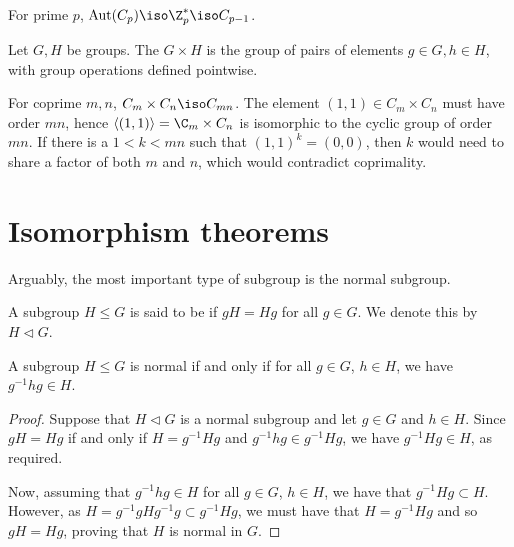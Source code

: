 \documentclass[12pt]{report}
\newcommand{\Aut}{\operatorname{Aut}}
\begin{document}
\begin{example}
  For prime \(p\), \(\Aut(C_{p}) \iso \Z^{*}_{p} \iso C_{p-1}\).
\end{example}

\begin{definition}
  Let \(G, H\) be groups.
  The  \(G \times H\) is the group of pairs of elements \(g \in G, h \in H\), with group operations defined pointwise.
\end{definition}

\begin{example}
  For coprime \(m, n\), \(C_{m} \times C_{n} \iso C_{mn}\).
  The element \((1,1) \in C_{m} \times C_{n}\) must have order \(mn\), hence \(\langle (1,1)\rangle= \C_{m} \times C_{n}\) is isomorphic to the cyclic group of order \(mn\).
  If there is a \(1 < k < mn\) such that \((1,1)^{k} = (0,0)\), then \(k\) would need to share a factor of both \(m\) and \(n\), which would contradict coprimality.
\end{example}



\section{Isomorphism theorems}
\label{sec:group-theory:isomorphism-theorems}

Arguably, the most important type of subgroup is the normal subgroup.

\begin{definition}
  A subgroup \(H \leq G\) is said to be  if \(gH = Hg\) for all \(g \in G\).
  We denote this by \(H \triangleleft G\).
\end{definition}

\begin{lemma}
 \label{lem:group-theory:normal-subgroup-criterion}
  A subgroup \(H \leq G\) is normal if and only if for all \(g \in G\), \(h \in H\), we have \(g^{-1}hg \in H\).
\end{lemma}

\begin{proof}
  Suppose that \(H \triangleleft G\) is a normal subgroup and let \(g \in G\) and \(h \in H\).
  Since \(gH = Hg\) if and only if \(H = g^{-1}Hg\) and \(g^{-1}hg \in  g^{-1}Hg\), we have \(g^{-1}Hg \in H\), as required.

  Now, assuming that \(g^{-1}hg \in H\) for all \(g \in G\), \(h \in H\), we have that \(g^{-1} H g \subset H\). However, as \(H = g^{-1}gHg^{-1}g \subset g^{-1}Hg\), we must have that \(H = g^{-1}Hg\) and so \(gH = Hg\), proving that \(H\) is normal in \(G\).
\end{proof}
\end{document}

